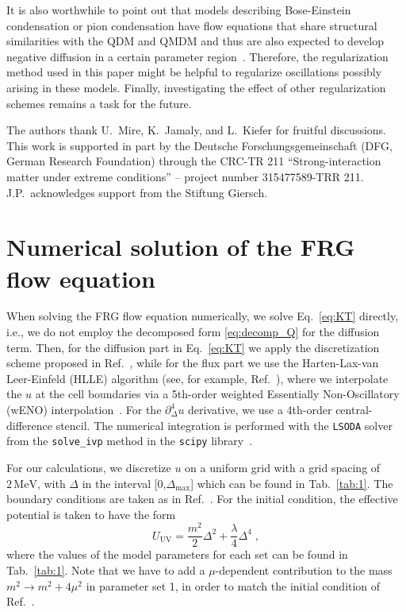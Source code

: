 \documentclass[
onecolumn,
aps,
prd,
amsmath,
amssymb,
nofootinbib
]{revtex4-2}
\begin{document}
It is also worthwhile to point out that  models describing Bose-Einstein condensation or pion condensation have flow equations that share structural similarities with the QDM and QMDM and thus are also expected to develop negative diffusion in a certain parameter region~\cite{Terazaki:2024evv,Svanes_2011}. 
Therefore, the regularization method used in this paper might be helpful to regularize oscillations possibly arising in these models. 
Finally, investigating the effect of other regularization schemes remains a task for the future. 


\begin{acknowledgments}
The authors thank U.~Mire, K.~Jamaly, and L.~Kiefer for fruitful discussions. 
This work is supported in part by the Deutsche Forschungsgemeinschaft (DFG, German Research Foundation) through the CRC-TR 211 ``Strong-interaction matter under extreme conditions'' -- project number
315477589-TRR 211. J.P.~acknowledges support from the Stiftung Giersch.
\end{acknowledgments}

\appendix

\section{Numerical solution of the FRG flow equation}\label{sec:appendix_A}
When solving the FRG flow equation numerically, we solve Eq.~\eqref{eq:KT} directly, i.e., we do not employ the decomposed form \eqref{eq:decomp_Q} for the diffusion term. 
Then, for the diffusion part in Eq.~\eqref{eq:KT} we apply the discretization scheme proposed in Ref.~\cite{Kurganov2000Scheme}, while for the flux part we use the Harten-Lax-van Leer-Einfeld (HLLE) algorithm (see, for example, Ref.~\cite{toro2013riemann}), where we interpolate the $u$ at the cell boundaries via a 5th-order weighted Essentially Non-Oscillatory (wENO) interpolation~\cite{Shu2009wENO}. 
For the $\partial_\Delta^4 u$ derivative, we use a 4th-order central-difference stencil. The numerical integration is performed with the \texttt{LSODA} solver from the \texttt{solve\_ivp} method in the \texttt{scipy} library~\cite{2020SciPy-NMeth}.


For our calculations, we discretize $u$ on a uniform grid with a grid spacing of $2\,\text{MeV}$, with $\Delta$ in the interval [0,$\Delta_{\mathrm{max}}$] which can be found in Tab.~\ref{tab:1}.
The boundary conditions are taken as in Ref.~\cite{Koenigstein:2021syz}. 
For the initial condition, the effective potential is taken to have the form
\begin{equation}
	U_\mathrm{UV} = \frac{m^2}{2}\Delta^2 + \frac{\lambda}{4}\Delta^4\;,
\end{equation}
where the values of the model parameters for each set can be found in Tab.~\ref{tab:1}. 
Note that we have to add a $\mu$-dependent contribution to the mass $m^2\to m^2 +4\mu^2$ in parameter set 1, in order to match the initial condition of Ref.~\cite{stoll2025nonperturbative}.
\end{document}
